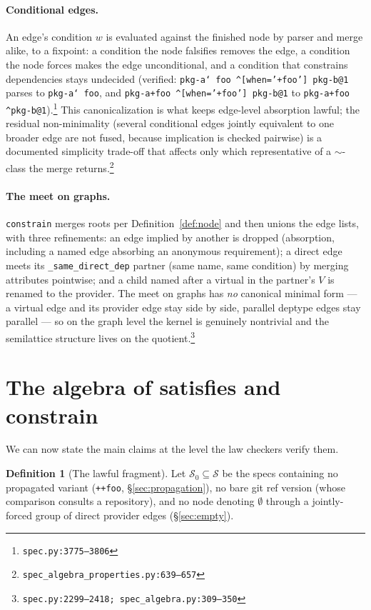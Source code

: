 \documentclass[11pt]{article}
\theoremstyle{definition}
\newtheorem{definition}[theorem]{Definition}
\theoremstyle{remark}
\renewcommand{\ker}{\sim}
\newcommand{\Spec}{\mathcal{S}}
\newcommand{\code}[1]{\texttt{#1}}
\newcommand{\src}[1]{\footnote{\code{#1}}}
\begin{document}
\paragraph{Conditional edges.}
An edge's condition $w$ is evaluated against the finished node by parser and
merge alike, to a fixpoint: a condition the node falsifies removes the edge, a
condition the node forces makes the edge unconditional, and a condition that
constrains dependencies stays undecided (verified: \code{pkg-a\char`~foo
\^{}[when='+foo'] pkg-b@1} parses to \code{pkg-a\char`~foo}, and
\code{pkg-a+foo \^{}[when='+foo'] pkg-b@1} to \code{pkg-a+foo
\^{}pkg-b@1}).\src{spec.py:3775--3806}  This canonicalization is what keeps
edge-level absorption lawful; the residual non-minimality (several conditional
edges jointly equivalent to one broader edge are not fused, because
implication is checked pairwise) is a documented simplicity trade-off that
affects only which representative of a $\ker$-class the merge
returns.\src{spec\_algebra\_properties.py:639--657}

\paragraph{The meet on graphs.}
\code{constrain} merges roots per Definition~\ref{def:node} and then unions
the edge lists, with three refinements: an edge implied by another is dropped
(absorption, including a named edge absorbing an anonymous requirement); a
direct edge meets its \code{\_same\_direct\_dep} partner (same name, same
condition) by merging attributes pointwise; and a child named after a virtual
in the partner's $V$ is renamed to the provider.  The meet on graphs has
\emph{no} canonical minimal form --- a virtual edge and its provider edge stay
side by side, parallel deptype edges stay parallel --- so on the graph level
the kernel is genuinely nontrivial and the semilattice structure lives on the
quotient.\src{spec.py:2299--2418; spec\_algebra.py:309--350}

\section{The algebra of satisfies and constrain}\label{sec:algebra}

We can now state the main claims at the level the law checkers verify them.

\begin{definition}[The lawful fragment]\label{def:fragment}
Let $\Spec_0 \subseteq \Spec$ be the specs containing no propagated variant
(\code{++foo}, \S\ref{sec:propagation}), no bare git ref version (whose
comparison consults a repository), and no node denoting $\emptyset$ through a
jointly-forced group of direct provider edges (\S\ref{sec:empty}).
\end{definition}
\end{document}

